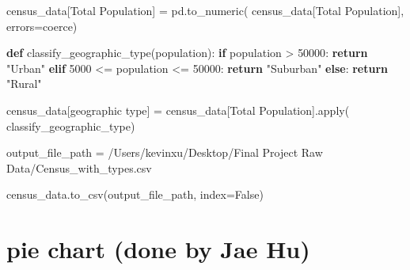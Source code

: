 \documentclass[
  letterpaper,
  DIV=11,
  numbers=noendperiod]{scrartcl}
\newenvironment{Shaded}{\begin{snugshade}}{\end{snugshade}}
\newcommand{\BuiltInTok}[1]{\textcolor[rgb]{0.00,0.23,0.31}{#1}}
\newcommand{\ControlFlowTok}[1]{\textcolor[rgb]{0.00,0.23,0.31}{\textbf{#1}}}
\newcommand{\DecValTok}[1]{\textcolor[rgb]{0.68,0.00,0.00}{#1}}
\newcommand{\KeywordTok}[1]{\textcolor[rgb]{0.00,0.23,0.31}{\textbf{#1}}}
\newcommand{\NormalTok}[1]{\textcolor[rgb]{0.00,0.23,0.31}{#1}}
\newcommand{\OperatorTok}[1]{\textcolor[rgb]{0.37,0.37,0.37}{#1}}
\newcommand{\StringTok}[1]{\textcolor[rgb]{0.13,0.47,0.30}{#1}}
\newcommand{\VariableTok}[1]{\textcolor[rgb]{0.07,0.07,0.07}{#1}}
\begin{document}
\begin{Shaded}
\begin{Highlighting}[]
\NormalTok{census\_data[}\StringTok{\textquotesingle{}Total Population\textquotesingle{}}\NormalTok{] }\OperatorTok{=}\NormalTok{ pd.to\_numeric(}
\NormalTok{    census\_data[}\StringTok{\textquotesingle{}Total Population\textquotesingle{}}\NormalTok{], errors}\OperatorTok{=}\StringTok{\textquotesingle{}coerce\textquotesingle{}}\NormalTok{)}


\KeywordTok{def}\NormalTok{ classify\_geographic\_type(population):}
    \ControlFlowTok{if}\NormalTok{ population }\OperatorTok{\textgreater{}} \DecValTok{50000}\NormalTok{:}
        \ControlFlowTok{return} \StringTok{"Urban"}
    \ControlFlowTok{elif} \DecValTok{5000} \OperatorTok{\textless{}=}\NormalTok{ population }\OperatorTok{\textless{}=} \DecValTok{50000}\NormalTok{:}
        \ControlFlowTok{return} \StringTok{"Suburban"}
    \ControlFlowTok{else}\NormalTok{:}
        \ControlFlowTok{return} \StringTok{"Rural"}


\NormalTok{census\_data[}\StringTok{\textquotesingle{}geographic type\textquotesingle{}}\NormalTok{] }\OperatorTok{=}\NormalTok{ census\_data[}\StringTok{\textquotesingle{}Total Population\textquotesingle{}}\NormalTok{].}\BuiltInTok{apply}\NormalTok{(}
\NormalTok{    classify\_geographic\_type)}

\NormalTok{output\_file\_path }\OperatorTok{=} \StringTok{\textquotesingle{}/Users/kevinxu/Desktop/Final Project Raw Data/Census\_with\_types.csv\textquotesingle{}}

\NormalTok{census\_data.to\_csv(output\_file\_path, index}\OperatorTok{=}\VariableTok{False}\NormalTok{)}
\end{Highlighting}
\end{Shaded}

\section{pie chart (done by Jae Hu)}\label{pie-chart-done-by-jae-hu}
\end{document}
